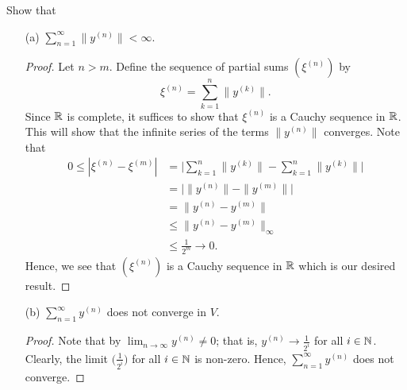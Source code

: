 \documentclass[a4paper]{article}
\begin{document}
\begin{enumerate}
Show that 
\begin{enumerate}
    \item[(a)] \( \sum_{ n=1  }^{ \infty  } \|y^{(n)}\| < \infty  \).
        \begin{proof}
       Let \( n > m  \). Define the sequence of partial sums \( ( \xi^{(n)} )  \) by 
        \[  \xi^{(n)} = \sum_{ k=1  }^{ n } \|y^{(k)}\|. \]
        Since \( \mathbb{R}  \) is complete, it suffices to show that \( \xi^{(n)} \) is a Cauchy sequence in \( \mathbb{R}  \). This will show that the infinite series of the terms \( \|y^{(n)}\| \) converges. Note that  
        \begin{align*}
           0 \leq | \xi^{(n)} - \xi^{(m)} |  &= \Big| \sum_{ k=1  }^{ n } \|y^{(k)}\| - \sum_{ k=1  }^{ n } \|y^{(k)}\| \Big|  \\
                                             &= \Big| \|y^{(n)}\| - \|y^{(m)}\| \Big| \\
                                             &= \|y^{(n)} - y^{(m)} \| \\
                                             &\leq \| y^{(n)} - y^{(m)} \|_{\infty } \\
                                             &\leq \frac{ 1 }{ 2^{m} }  \to 0. \tag{\( n,m \to \infty \)} 
        \end{align*}
        Hence, we see that \(  ( \xi^{(n)} ) \) is a Cauchy sequence in \( \mathbb{R}  \) which is our desired result.

        \end{proof}
    \item[(b)] \( \sum_{ n=1  }^{ \infty  } y^{(n)} \) does not converge in \( V  \).
        \begin{proof}
        Note that by \( \lim_{ n \to \infty  }  y^{(n)} \neq 0   \); that is, \( y^{(n)} \to \frac{ 1 }{ 2^{i} }   \) for all \( i \in \mathbb{N} \). Clearly, the limit \( \Big(  \frac{ 1 }{ 2^{i} }  \Big)  \) for all \( i \in \mathbb{N} \) is non-zero.  Hence, \( \sum_{ n=1  }^{ \infty  } y^{(n)} \) does not converge.  
        \end{proof}
\end{enumerate}
\end{enumerate}
\end{document}
